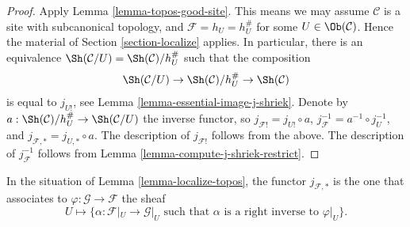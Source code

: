 \begin{proof}
Apply
Lemma \ref{lemma-topos-good-site}.
This means we may assume $\mathcal{C}$ is a site
with subcanonical topology, and $\mathcal{F} = h_U = h_U^\#$
for some $U \in \Ob(\mathcal{C})$.
Hence the material of
Section \ref{section-localize}
applies. In particular, there is an equivalence
$\Sh(\mathcal{C}/U) = \Sh(\mathcal{C})/h_U^\#$
such that the composition
$$
\Sh(\mathcal{C}/U)
\to
\Sh(\mathcal{C})/h_U^\#
\to \Sh(\mathcal{C})
$$
is equal to $j_{U!}$, see
Lemma \ref{lemma-essential-image-j-shriek}.
Denote by
$a : \Sh(\mathcal{C})/h_U^\# \to \Sh(\mathcal{C}/U)$
the inverse functor, so $j_{\mathcal{F}!} = j_{U!} \circ a$,
$j_\mathcal{F}^{-1} = a^{-1} \circ j_U^{-1}$, and
$j_{\mathcal{F}, *} = j_{U, *} \circ a$. The description of
$j_{\mathcal{F}!}$ follows from the above. The description of
$j_\mathcal{F}^{-1}$ follows from
Lemma \ref{lemma-compute-j-shriek-restrict}.
\end{proof}

\begin{lemma}
\label{lemma-localize-pushforward}
In the situation of Lemma \ref{lemma-localize-topos}, the functor
$j_{\mathcal{F}, *}$ is the one that associates to
$\varphi : \mathcal{G} \to \mathcal{F}$ the sheaf
$$
U
\longmapsto
\{\alpha : \mathcal{F}|_U \to \mathcal{G}|_U
\text{ such that } \alpha \text{ is a right inverse to }\varphi|_U \}.
$$
\end{lemma}

